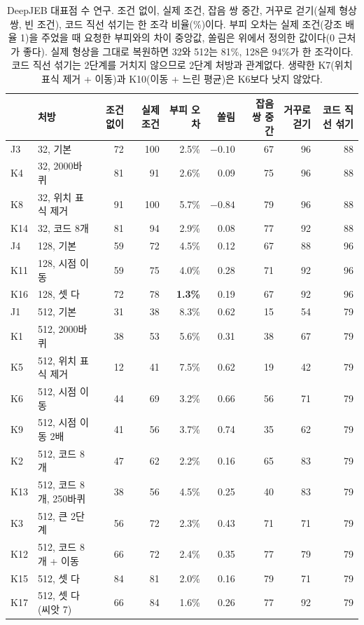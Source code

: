 \documentclass[11pt]{article}
\begin{document}
\begin{table}[htbp]
\centering\footnotesize\setlength{\tabcolsep}{3.2pt}
\begin{tabular}{l l r r r r r r r}
\toprule
& 처방 & 조건 없이 & 실제 조건 & 부피 오차 & 쏠림 & 잡음 쌍 중간 & 거꾸로 걷기 & 코드 직선 섞기 \\
\midrule
J3 & 32, 기본 & 72 & 100 & 2.5\% & $-0.10$ & 67 & 96 & 88 \\
K4 & 32, 2000바퀴 & 81 & 91 & 2.6\% & 0.09 & 75 & 96 & 88 \\
K8 & 32, 위치 표식 제거 & 91 & 100 & 5.7\% & $-0.84$ & 79 & 96 & 88 \\
K14 & 32, 코드 8개 & 81 & 94 & 2.9\% & 0.08 & 77 & 92 & 88 \\
\midrule
J4 & 128, 기본 & 59 & 72 & 4.5\% & 0.12 & 67 & 88 & 96 \\
K11 & 128, 시점 이동 & 59 & 75 & 4.0\% & 0.28 & 71 & 92 & 96 \\
K16 & 128, 셋 다 & 72 & 78 & \textbf{1.3\%} & 0.19 & 67 & 92 & 96 \\
\midrule
J1 & 512, 기본 & 31 & 38 & 8.3\% & 0.62 & 15 & 54 & 79 \\
K1 & 512, 2000바퀴 & 38 & 53 & 5.6\% & 0.31 & 38 & 67 & 79 \\
K5 & 512, 위치 표식 제거 & 12 & 41 & 7.5\% & 0.62 & 19 & 42 & 79 \\
K6 & 512, 시점 이동 & 44 & 69 & 3.2\% & 0.66 & 56 & 71 & 79 \\
K9 & 512, 시점 이동 2배 & 41 & 56 & 3.7\% & 0.74 & 35 & 62 & 79 \\
K2 & 512, 코드 8개 & 47 & 62 & 2.2\% & 0.16 & 65 & 83 & 79 \\
K13 & 512, 코드 8개, 250바퀴 & 38 & 56 & 4.5\% & 0.25 & 40 & 83 & 79 \\
K3 & 512, 큰 2단계 & 56 & 72 & 2.3\% & 0.43 & 71 & 71 & 79 \\
K12 & 512, 코드 8개 + 이동 & 66 & 72 & 2.4\% & 0.35 & 77 & 79 & 79 \\
K15 & 512, 셋 다 & 84 & 81 & 2.0\% & 0.16 & 79 & 71 & 79 \\
K17 & 512, 셋 다(씨앗 7) & 66 & 84 & 1.6\% & 0.26 & 77 & 92 & 79 \\
\bottomrule
\end{tabular}
\caption{DeepJEB 대표점 수 연구. 조건 없이, 실제 조건, 잡음 쌍 중간, 거꾸로 걷기(실제 형상 쌍, 빈 조건), 코드 직선 섞기는 한 조각 비율(\%)이다.
부피 오차는 실제 조건(강조 배율 1)을 주었을 때 요청한 부피와의 차이 중앙값, 쏠림은 위에서 정의한 값이다(0 근처가 좋다).
실제 형상을 그대로 복원하면 32와 512는 81\%, 128은 94\%가 한 조각이다. 코드 직선 섞기는 2단계를 거치지 않으므로 2단계 처방과 관계없다.
생략한 K7(위치 표식 제거 + 이동)과 K10(이동 + 느린 평균)은 K6보다 낫지 않았다.}
\label{tab:tsizejeb}
\end{table}
\end{document}
